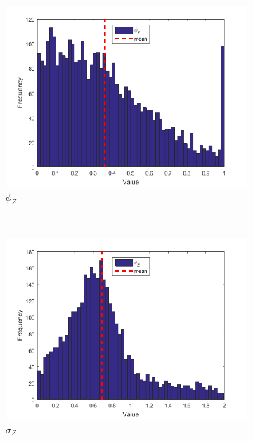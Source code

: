 \documentclass[11pt,a4,twosided,singlespacing,titlepagenumber=on]{scrreprt}
\numberwithin{equation}{chapter} %
\theoremstyle{remark}
\begin{document}
\begin{figure}[H]
\begin{subfigure}[t]{0.32\textwidth}
        \includegraphics[width=1\textwidth]{res/params/5845_6575/3}
        \caption{$\phi_Z$}
    \end{subfigure} \\
    \begin{subfigure}[t]{0.32\textwidth}
        \centering
        \includegraphics[width=1\textwidth]{res/params/5845_6575/4}
        \caption{$\sigma_Z$}
    \end{subfigure}
    \begin{subfigure}[t]{0.32\textwidth}
        \centering

\end{subfigure}
\end{figure}
\end{document}
